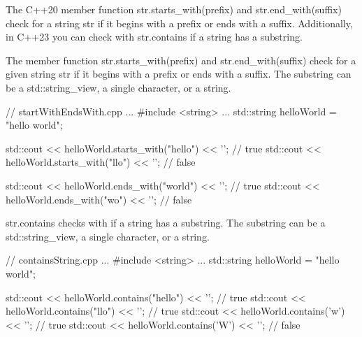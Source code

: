 The C++20 member function str.starts\_with(prefix) and str.end\_with(suffix) check for a string str if it begins with a prefix or ends with a suffix. Additionally, in C++23 you can check with str.contains if a string has a substring.



The member function str.starts\_with(prefix) and str.end\_with(suffix) check for a given string str if it begins with a prefix or ends with a suffix. The substring can be a std::string\_view, a single character, or a string.


\begin{cpp}
// startWithEndsWith.cpp
...
#include <string>
...
std::string helloWorld = "hello world";

std::cout << helloWorld.starts_with("hello") << '\n'; // true
std::cout << helloWorld.starts_with("llo") << '\n'; // false

std::cout << helloWorld.ends_with("world") << '\n'; // true
std::cout << helloWorld.ends_with("wo") << '\n'; // false
\end{cpp}


str.contains checks with if a string has a substring. The substring can be a std::string\_view, a single character, or a string.


\begin{cpp}
// containsString.cpp
...
#include <string>
...
std::string helloWorld = "hello world";

std::cout << helloWorld.contains("hello") << '\n'; // true
std::cout << helloWorld.contains("llo") << '\n'; // true
std::cout << helloWorld.contains('w') << '\n'; // true
std::cout << helloWorld.contains('W') << '\n'; // false
\end{cpp}

































